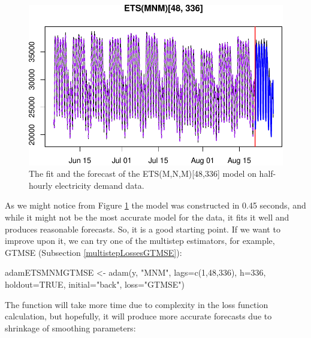 \documentclass[
]{book}
\newenvironment{Shaded}{\begin{snugshade}}{\end{snugshade}}
\newcommand{\AttributeTok}[1]{\textcolor[rgb]{0.77,0.63,0.00}{#1}}
\newcommand{\ConstantTok}[1]{\textcolor[rgb]{0.00,0.00,0.00}{#1}}
\newcommand{\DecValTok}[1]{\textcolor[rgb]{0.00,0.00,0.81}{#1}}
\newcommand{\FunctionTok}[1]{\textcolor[rgb]{0.00,0.00,0.00}{#1}}
\newcommand{\NormalTok}[1]{#1}
\newcommand{\OtherTok}[1]{\textcolor[rgb]{0.56,0.35,0.01}{#1}}
\newcommand{\StringTok}[1]{\textcolor[rgb]{0.31,0.60,0.02}{#1}}
\theoremstyle{definition}
\theoremstyle{definition}
\theoremstyle{definition}
\theoremstyle{definition}
\theoremstyle{remark}
\begin{document}
\begin{figure}
\centering
\includegraphics{Svetunkov--2022----ADAM_files/figure-latex/adamModelETSMNM-1.pdf}
\caption{\label{fig:adamModelETSMNM}The fit and the forecast of the ETS(M,N,M){[}48,336{]} model on half-hourly electricity demand data.}
\end{figure}

As we might notice from Figure \ref{fig:adamModelETSMNM} the model was constructed in 0.45 seconds, and while it might not be the most accurate model for the data, it fits it well and produces reasonable forecasts. So, it is a good starting point. If we want to improve upon it, we can try one of the multistep estimators, for example, GTMSE (Subsection \ref{multistepLossesGTMSE}):

\begin{Shaded}
\begin{Highlighting}[]
\NormalTok{adamETSMNMGTMSE }\OtherTok{\textless{}{-}} \FunctionTok{adam}\NormalTok{(y, }\StringTok{"MNM"}\NormalTok{, }\AttributeTok{lags=}\FunctionTok{c}\NormalTok{(}\DecValTok{1}\NormalTok{,}\DecValTok{48}\NormalTok{,}\DecValTok{336}\NormalTok{),}
                        \AttributeTok{h=}\DecValTok{336}\NormalTok{, }\AttributeTok{holdout=}\ConstantTok{TRUE}\NormalTok{,}
                        \AttributeTok{initial=}\StringTok{"back"}\NormalTok{, }\AttributeTok{loss=}\StringTok{"GTMSE"}\NormalTok{)}
\end{Highlighting}
\end{Shaded}

The function will take more time due to complexity in the loss function calculation, but hopefully, it will produce more accurate forecasts due to shrinkage of smoothing parameters:
\end{document}
